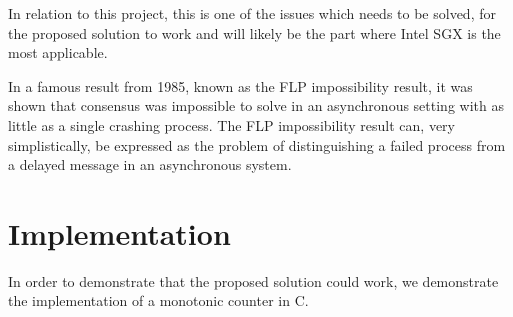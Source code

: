 \documentclass[12pt]{article}
\newcommand\cpp{C\nolinebreak[4]\hspace{-.05em}\raisebox{.4ex}{\relsize{-3}{\textbf{++}}}}
\begin{document}
		In relation to this project, this is one of the issues which needs to be solved, for the proposed solution to work and will likely be the part where Intel SGX is the most applicable.

		In a famous result from 1985, known as the FLP impossibility result\cite{flp}, it was shown that consensus was impossible to solve in an asynchronous setting with as little as a single crashing process. The FLP impossibility result can, very simplistically, be expressed as the problem of distinguishing a failed process from a delayed message in an asynchronous system.\\

	\section{Implementation}
	In order to demonstrate that the proposed solution could work, we demonstrate the implementation of a monotonic counter in \cpp.
\end{document}
